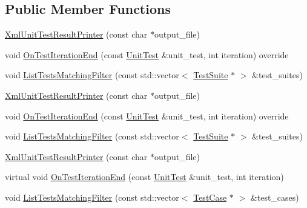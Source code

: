 \subsection*{Public Member Functions}
\begin{DoxyCompactItemize}
\item 
\mbox{\hyperlink{classtesting_1_1internal_1_1_xml_unit_test_result_printer_afdaf88e6764c18ce0dcc3733d7a06e31}{Xml\+Unit\+Test\+Result\+Printer}} (const char $\ast$output\+\_\+file)
\item 
void \mbox{\hyperlink{classtesting_1_1internal_1_1_xml_unit_test_result_printer_abf972ca903d66d5ea52d9b1bc0a27f21}{On\+Test\+Iteration\+End}} (const \mbox{\hyperlink{classtesting_1_1_unit_test}{Unit\+Test}} \&unit\+\_\+test, int iteration) override
\item 
void \mbox{\hyperlink{classtesting_1_1internal_1_1_xml_unit_test_result_printer_a5bbda9739d45a9e01190b2663dcbc5ac}{List\+Tests\+Matching\+Filter}} (const std\+::vector$<$ \mbox{\hyperlink{classtesting_1_1_test_suite}{Test\+Suite}} $\ast$ $>$ \&test\+\_\+suites)
\item 
\mbox{\hyperlink{classtesting_1_1internal_1_1_xml_unit_test_result_printer_afdaf88e6764c18ce0dcc3733d7a06e31}{Xml\+Unit\+Test\+Result\+Printer}} (const char $\ast$output\+\_\+file)
\item 
void \mbox{\hyperlink{classtesting_1_1internal_1_1_xml_unit_test_result_printer_abf972ca903d66d5ea52d9b1bc0a27f21}{On\+Test\+Iteration\+End}} (const \mbox{\hyperlink{classtesting_1_1_unit_test}{Unit\+Test}} \&unit\+\_\+test, int iteration) override
\item 
void \mbox{\hyperlink{classtesting_1_1internal_1_1_xml_unit_test_result_printer_a5bbda9739d45a9e01190b2663dcbc5ac}{List\+Tests\+Matching\+Filter}} (const std\+::vector$<$ \mbox{\hyperlink{classtesting_1_1_test_suite}{Test\+Suite}} $\ast$ $>$ \&test\+\_\+suites)
\item 
\mbox{\hyperlink{classtesting_1_1internal_1_1_xml_unit_test_result_printer_afdaf88e6764c18ce0dcc3733d7a06e31}{Xml\+Unit\+Test\+Result\+Printer}} (const char $\ast$output\+\_\+file)
\item 
virtual void \mbox{\hyperlink{classtesting_1_1internal_1_1_xml_unit_test_result_printer_a37cf92d3953b2be56f9fcb049a68846c}{On\+Test\+Iteration\+End}} (const \mbox{\hyperlink{classtesting_1_1_unit_test}{Unit\+Test}} \&unit\+\_\+test, int iteration)
\item 
void \mbox{\hyperlink{classtesting_1_1internal_1_1_xml_unit_test_result_printer_acbfdcacec7f668163fa0ccef771f72db}{List\+Tests\+Matching\+Filter}} (const std\+::vector$<$ \mbox{\hyperlink{classtesting_1_1_test_case}{Test\+Case}} $\ast$ $>$ \&test\+\_\+cases)
\end{DoxyCompactItemize}
